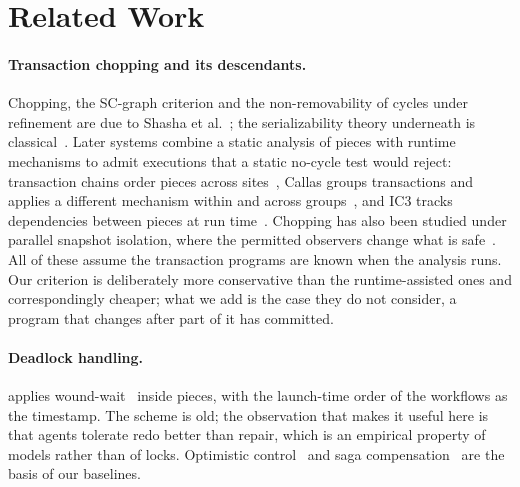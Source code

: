 \section{Related Work}
\label{sec:related}

\paragraph{Transaction chopping and its descendants.}
Chopping, the SC-graph criterion and the non-removability of cycles under
refinement are due to Shasha et al.~\cite{shasha1995chopping}; the
serializability theory underneath is
classical~\cite{bernstein1987,eswaran1976}. Later systems combine a static
analysis of pieces with runtime mechanisms to admit executions that a static
no-cycle test would reject: transaction chains order pieces across
sites~\cite{zhang2013chains}, Callas groups transactions and applies a
different mechanism within and across groups~\cite{xie2015callas}, and IC3
tracks dependencies between pieces at run time~\cite{wang2016ic3}. Chopping
has also been studied under parallel snapshot isolation, where the permitted
observers change what is safe~\cite{cerone2015psi}. All of these assume the
transaction programs are known when the analysis runs. Our criterion is
deliberately more conservative than the runtime-assisted ones and
correspondingly cheaper; what we add is the case they do not consider, a
program that changes after part of it has committed.

\paragraph{Deadlock handling.}
\ccs applies wound-wait~\cite{rosenkrantz1978} inside pieces, with the
launch-time order of the workflows as the timestamp. The scheme is old; the
observation that makes it useful here is that agents tolerate redo better than
repair, which is an empirical property of models rather than of locks.
Optimistic control~\cite{kung1981occ} and saga
compensation~\cite{garciamolina1987sagas} are the basis of our baselines.

